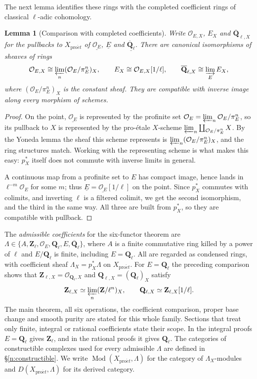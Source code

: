 \documentclass[11pt,a4paper]{article}
\numberwithin{equation}{section}
\newtheorem{lemma}[theorem]{Lemma}
\theoremstyle{definition}
\theoremstyle{remark}
\newcommand{\Mod}{\operatorname{Mod}}
\newcommand{\Qbar}{\overline{\mathbf Q}_\ell}
\newcommand{\Ql}{\mathbf Q_\ell}
\newcommand{\Zl}{\mathbf Z_\ell}
\newcommand{\proet}{\mathrm{pro}\acute{e}t}
\newcommand{\QbarX}{\overline{\mathbf Q}_{\ell,X}}
\begin{document}
The next lemma identifies these rings with the completed coefficient
rings of classical $\ell$-adic cohomology.

\begin{lemma}[Comparison with completed coefficients]
\label{n:coefficient-comparison}
Write $\mathcal O_{E,X}$, $E_X$ and $\QbarX$ for the pullbacks to
$X_{\proet}$ of $\underline{\mathcal O_E}$, $\underline E$ and
$\underline{\Qbar}$. There are canonical isomorphisms of sheaves of rings
\[
 \mathcal O_{E,X}\cong\varprojlim_n(\mathcal O_E/\pi_E^n)_X,
 \qquad E_X\cong\mathcal O_{E,X}[1/\ell],
 \qquad \QbarX\cong\varinjlim_E E_X,
\]
where $(\mathcal O_E/\pi_E^n)_X$ is the constant sheaf. They are
compatible with inverse image along every morphism of schemes.
\end{lemma}
\begin{proof}
On the point, $\underline{\mathcal O_E}$ is represented by the profinite
set $\mathcal O_E=\varprojlim_n\mathcal O_E/\pi_E^n$, so its pullback to
$X$ is represented by the pro-\'etale $X$-scheme
$\varprojlim_n\coprod_{\mathcal O_E/\pi_E^n}X$. By the Yoneda lemma the
sheaf this scheme represents is $\varprojlim_n(\mathcal O_E/\pi_E^n)_X$,
and the ring structures match. Working with the representing scheme is
what makes this easy: $p_X^*$ itself does not commute with inverse limits
in general.

A continuous map from a profinite set to $E$ has compact image, hence
lands in $\ell^{-m}\mathcal O_E$ for some $m$; thus
$\underline E=\underline{\mathcal O_E}[1/\ell]$ on the point. Since $p_X^*$
commutes with colimits, and inverting $\ell$ is a filtered colimit, we get
the second isomorphism, and the third in the same way. All three are built
from $p_X^*$, so they are compatible with pullback.
\end{proof}

The \emph{admissible coefficients} for the six-functor theorem are
$\Lambda\in\{A,\Zl,\mathcal O_E,\Ql,E,\Qbar\}$, where $A$ is a
finite commutative ring killed by a power of $\ell$ and $E/\Ql$ is
finite, including $E=\Ql$. All are regarded as condensed rings,
with coefficient sheaf $\Lambda_X=p_X^*\Lambda$ on $X_{\proet}$.
For $E=\Ql$ the preceding comparison shows that
$\mathbf Z_{\ell,X}=\mathcal O_{\Ql,X}$ and $\mathbf Q_{\ell,X}=(\Ql)_X$
satisfy
\[
 \mathbf Z_{\ell,X}\simeq\varprojlim_n(\mathbf Z/\ell^n)_X,
 \qquad
 \mathbf Q_{\ell,X}\simeq\mathbf Z_{\ell,X}[1/\ell].
\]
The main theorem, all six operations, the coefficient comparison,
proper base change and smooth purity are stated for this whole family.
Sections that treat only finite, integral or rational coefficients
state their scope. In the integral proofs $E=\Ql$ gives $\Zl$, and in the rational
proofs it gives $\Ql$. The categories of constructible complexes used
for every admissible $\Lambda$ are defined in
\S\ref{n:constructible}.
We write $\Mod(X_{\proet},\Lambda)$ for the category of
$\Lambda_X$-modules and $D(X_{\proet},\Lambda)$ for its derived category.
\end{document}
